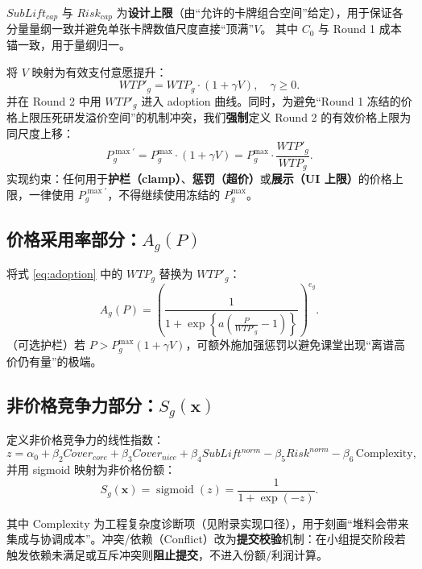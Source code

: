 \documentclass[UTF8,12pt]{ctexart}
\DeclareMathOperator{\sigmoid}{sigmoid}
\begin{document}
$SubLift_{cap}$ 与 $Risk_{cap}$ 为\textbf{设计上限}（由“允许的卡牌组合空间”给定），用于保证各分量量纲一致并避免单张卡牌数值尺度直接“顶满”$V$。
其中 $C_0$ 与 Round 1 成本锚一致，用于量纲归一。

将 $V$ 映射为有效支付意愿提升：
\begin{equation}
WTP'_g = WTP_g\cdot (1+\gamma V),\quad \gamma\ge 0.
\label{eq:wtp_prime}
\end{equation}
并在 Round 2 中用 $WTP'_g$ 进入 adoption 曲线。同时，为避免“Round 1 冻结的价格上限压死研发溢价空间”的机制冲突，我们\textbf{强制}定义 Round 2 的有效价格上限为同尺度上移：
\begin{equation}
P^{\max\prime}_g = P^{\max}_g\cdot (1+\gamma V)=P^{\max}_g\cdot \frac{WTP'_g}{WTP_g}.
\label{eq:pmax_prime}
\end{equation}
实现约束：任何用于\textbf{护栏（clamp）}、\textbf{惩罚（超价）}或\textbf{展示（UI 上限）}的价格上限，一律使用 $P^{\max\prime}_g$，不得继续使用冻结的 $P^{\max}_g$。

\subsection{价格采用率部分：$A_g(P)$}
将式 \eqref{eq:adoption} 中的 $WTP_g$ 替换为 $WTP'_g$：
\begin{equation}
A_g(P)=\left(\frac{1}{1+\exp\left\{a\left(\frac{P}{WTP'_g}-1\right)\right\}}\right)^{e_g}.
\label{eq:adoption_round2}
\end{equation}
（可选护栏）若 $P>P^{\max}_g(1+\gamma V)$，可额外施加强惩罚以避免课堂出现“离谱高价仍有量”的极端。

\subsection{非价格竞争力部分：$S_g(\mathbf{x})$}
定义非价格竞争力的线性指数：
\begin{equation}
z = \alpha_0 + \beta_2 Cover_{core} + \beta_3 Cover_{nice}
+ \beta_4 SubLift^{norm} - \beta_5 Risk^{norm} - \beta_6 \,\mathrm{Complexity},
\label{eq:z_nonprice}
\end{equation}
并用 sigmoid 映射为非价格份额：
\begin{equation}
S_g(\mathbf{x}) = \sigmoid(z) = \frac{1}{1+\exp(-z)}.
\end{equation}

其中 $\mathrm{Complexity}$ 为工程复杂度诊断项（见附录实现口径），用于刻画“堆料会带来集成与协调成本”。冲突/依赖（Conflict）改为\textbf{提交校验}机制：在小组提交阶段若触发依赖未满足或互斥冲突则\textbf{阻止提交}，不进入份额/利润计算。
\end{document}
